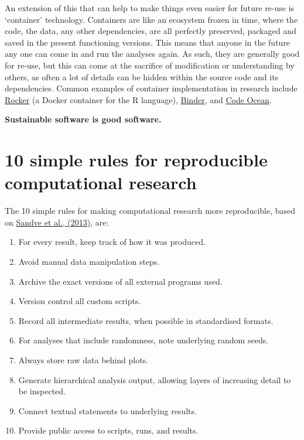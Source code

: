 \documentclass[]{book}
\providecommand{\tightlist}{%
  \setlength{\itemsep}{0pt}\setlength{\parskip}{0pt}}
\begin{document}
An extension of this that can help to make things even easier for future re-use is `container' technology. Containers are like an ecosystem frozen in time, where the code, the data, any other dependencies, are all perfectly preserved, packaged and saved in the present functioning versions. This means that anyone in the future any one can come in and run the analyses again. As such, they are generally good for re-use, but this can come at the sacrifice of modification or understanding by others, as often a lot of details can be hidden within the source code and its dependencies. Common examples of container implementation in research include \href{https://github.com/OpenScienceMOOC/Module-5-Open-Research-Software-and-Open-Source/blob/master/Reading\%20Material_Open\%20Source\%20and\%20Open\%20Research\%20Software/Boettiger\%20and\%20Eddelbuettel\%2C\%202017.pdf}{Rocker} (a Docker container for the R language), \href{https://mybinder.readthedocs.io/en/latest/}{Binder}, and \href{https://codeocean.com/}{Code Ocean}.

\textbf{Sustainable software is good software.}

\hypertarget{simple-rules-for-reproducible-computational-research}{%
\section{10 simple rules for reproducible computational research}\label{simple-rules-for-reproducible-computational-research}}

The 10 simple rules for making computational research more reproducible, based on \href{https://github.com/OpenScienceMOOC/Module-5-Open-Research-Software-and-Open-Source/blob/master/Reading\%20Material_Open\%20Source\%20and\%20Open\%20Research\%20Software/Sandve\%20et\%20al.\%2C\%202013.PDF}{Sandve et al., (2013)}, are:

\begin{enumerate}
\def\labelenumi{\arabic{enumi}.}
\tightlist
\item
  For every result, keep track of how it was produced.
\item
  Avoid manual data manipulation steps.
\item
  Archive the exact versions of all external programs used.
\item
  Version control all custom scripts.
\item
  Record all intermediate results, when possible in standardised formats.
\item
  For analyses that include randomness, note underlying random seeds.
\item
  Always store raw data behind plots.
\item
  Generate hierarchical analysis output, allowing layers of increasing detail to be inspected.
\item
  Connect textual statements to underlying results.
\item
  Provide public access to scripts, runs, and results.
\end{enumerate}
\end{document}
